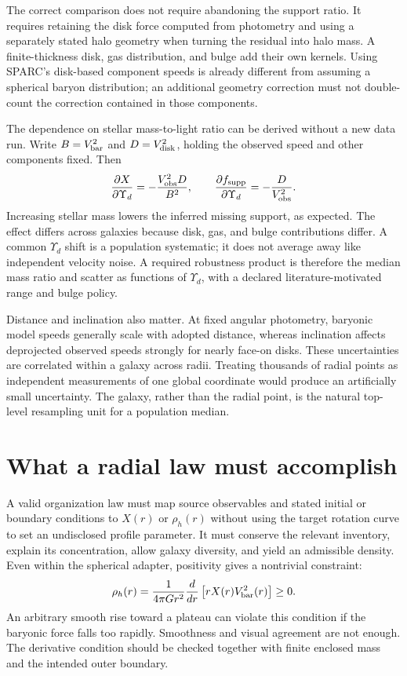The correct comparison does not require abandoning the support ratio. It requires retaining the disk force computed from photometry and using a separately stated halo geometry when turning the residual into halo mass. A finite-thickness disk, gas distribution, and bulge add their own kernels. Using SPARC's disk-based component speeds is already different from assuming a spherical baryon distribution; an additional geometry correction must not double-count the correction contained in those components.

The dependence on stellar mass-to-light ratio can be derived without a new data run. Write $B=V_{\rm bar}^2$ and $D=V_{\rm disk}^2$, holding the observed speed and other components fixed. Then
\begin{equation}
 \frac{\partial X}{\partial\Upsilon_d}
 =-\frac{V_{\rm obs}^2D}{B^2},\qquad
 \frac{\partial f_{\rm supp}}{\partial\Upsilon_d}
 =-\frac{D}{V_{\rm obs}^2}.
 \label{c10:upsderivative}
\end{equation}
Increasing stellar mass lowers the inferred missing support, as expected. The effect differs across galaxies because disk, gas, and bulge contributions differ. A common $\Upsilon_d$ shift is a population systematic; it does not average away like independent velocity noise. A required robustness product is therefore the median mass ratio and scatter as functions of $\Upsilon_d$, with a declared literature-motivated range and bulge policy.

Distance and inclination also matter. At fixed angular photometry, baryonic model speeds generally scale with adopted distance, whereas inclination affects deprojected observed speeds strongly for nearly face-on disks. These uncertainties are correlated within a galaxy across radii. Treating thousands of radial points as independent measurements of one global coordinate would produce an artificially small uncertainty. The galaxy, rather than the radial point, is the natural top-level resampling unit for a population median.

\section{What a radial law must accomplish}

A valid organization law must map source observables and stated initial or boundary conditions to $X(r)$ or $\rho_h(r)$ without using the target rotation curve to set an undisclosed profile parameter. It must conserve the relevant inventory, explain its concentration, allow galaxy diversity, and yield an admissible density. Even within the spherical adapter, positivity gives a nontrivial constraint:
\begin{equation}
 \rho_h(r)=\frac{1}{4\pi Gr^2}
 \frac{d}{dr}\left[rX(r)V_{\rm bar}^2(r)\right]\geq0.
 \label{c10:densitytest}
\end{equation}
An arbitrary smooth rise toward a plateau can violate this condition if the baryonic force falls too rapidly. Smoothness and visual agreement are not enough. The derivative condition should be checked together with finite enclosed mass and the intended outer boundary.


